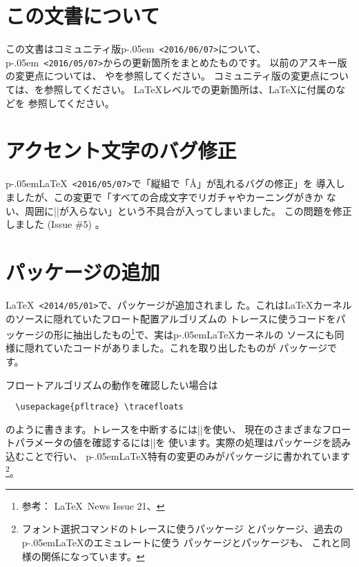 \documentclass{plnews}
\author{日本語\TeX{}開発コミュニティ（\texttt{https://texjp.org/}）}
\def\pLaTeX{p\kern-.05em\LaTeX}
\def\pLaTeXe{p\kern-.05em\LaTeXe}
\begin{document}
\maketitle

\section{この文書について}
この文書はコミュニティ版\pLaTeXe\ \texttt{<2016/06/07>}について、
\pLaTeXe\ \texttt{<2016/05/07>}からの更新箇所をまとめたものです。
以前のアスキー版の変更点については、
やを参照してください。
コミュニティ版の変更点については、を参照してください。
\LaTeX{}レベルでの更新箇所は、\LaTeX{}に付属のなどを
参照してください。


\section{アクセント文字のバグ修正}
\pLaTeX\ \texttt{<2016/05/07>}で「縦組で「\AA{}」が乱れるバグの修正」を
導入しましたが、この変更で「すべての合成文字でリガチャやカーニングがきか
ない、周囲に|\xkanjiskip|が入らない」という不具合が入ってしまいました。
この問題を修正しました (Issue \#5) 。


\section{パッケージの追加}
\LaTeX\ \texttt{<2014/05/01>}で、パッケージが追加されまし
た。これは\LaTeX{}カーネルのソースに隠れていたフロート配置アルゴリズムの
トレースに使うコードをパッケージの形に抽出したもの\footnote{参考：
\LaTeX\ News Issue 21、}で、実は\pLaTeX{}カーネルの
ソースにも同様に隠れていたコードがありました。これを取り出したものが
パッケージです。

フロートアルゴリズムの動作を確認したい場合は
\begin{verbatim}
  \usepackage{pfltrace} \tracefloats
\end{verbatim}
のように書きます。トレースを中断するには|\tracefloatsoff|を使い、
現在のさまざまなフロートパラメータの値を確認するには|\tracefloatvals|を
使います。実際の処理はパッケージを読み込むことで行い、
\pLaTeX{}特有の変更のみがパッケージに書かれています
\footnote{フォント選択コマンドのトレースに使うパッケージ
とパッケージ、過去の\pLaTeX{}のエミュレートに使う
パッケージとパッケージも、
これと同様の関係になっています。}。
\end{document}
